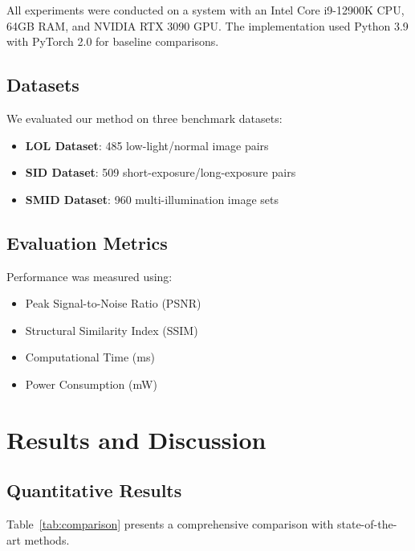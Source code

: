 \documentclass[journal,transmag]{IEEEtran}
\begin{document}
All experiments were conducted on a system with an Intel Core i9-12900K CPU, 64GB RAM, and NVIDIA RTX 3090 GPU. The implementation used Python 3.9 with PyTorch 2.0 for baseline comparisons.

\subsection{Datasets}

We evaluated our method on three benchmark datasets:
\begin{itemize}
    \item \textbf{LOL Dataset}: 485 low-light/normal image pairs
    \item \textbf{SID Dataset}: 509 short-exposure/long-exposure pairs
    \item \textbf{SMID Dataset}: 960 multi-illumination image sets
\end{itemize}

\subsection{Evaluation Metrics}

Performance was measured using:
\begin{itemize}
    \item Peak Signal-to-Noise Ratio (PSNR)
    \item Structural Similarity Index (SSIM)
    \item Computational Time (ms)
    \item Power Consumption (mW)
\end{itemize}

\section{Results and Discussion}

\subsection{Quantitative Results}

Table~\ref{tab:comparison} presents a comprehensive comparison with state-of-the-art methods.
\end{document}
